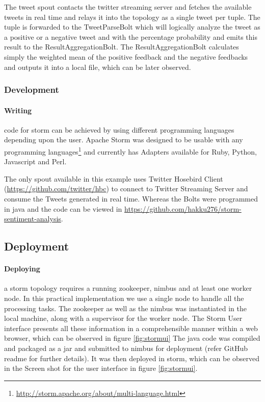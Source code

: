 \documentclass[runningheads,a4paper]{llncs}[2015/06/24]
\begin{document}
The tweet spout contacts the twitter streaming server and fetches the available tweets in real time and relays it into the topology as a single tweet per tuple. The tuple is forwarded to the TweetParseBolt which will logically analyze the tweet as a positive or a negative tweet and with the percentage probability and emits this result to the ResultAggregationBolt. The ResultAggregationBolt calculates simply the weighted mean of the positive feedback and the negative feedbacks and outputs it into a local file, which can be later observed.

\subsubsection{Development}
\paragraph{Writing} code for storm can be achieved by using different programming languages depending upon the user. Apache Storm was designed to be usable with any programming languages\footnote{\url{http://storm.apache.org/about/multi-language.html}} and currently has Adapters available for Ruby, Python, Javascript and Perl.

The only spout available in this example uses Twitter Hosebird Client (\url{https://github.com/twitter/hbc}) to connect to Twitter Streaming Server and consume the Tweets generated in real time. Whereas the Bolts were programmed in java and the code can be viewed in \url{https://github.com/hakku276/storm-sentiment-analysis}.

\subsection{Deployment}
\paragraph{Deploying} a storm topology requires a running zookeeper, nimbus and at least one worker node. In this practical implementation we use a single node to handle all the processing tasks. The zookeeper as well as the nimbus was instantiated in the local machine, along with a supervisor for the worker node. The Storm User interface presents all these information in a comprehensible manner within a web browser, which can be observed in figure \ref{fig:stormui} The java code was compiled and packaged as a jar and submitted to nimbus for deployment (refer GitHub readme for further details). It was then deployed in storm, which can be observed in the Screen shot for the user interface in figure \ref{fig:stormui}.
\end{document}
